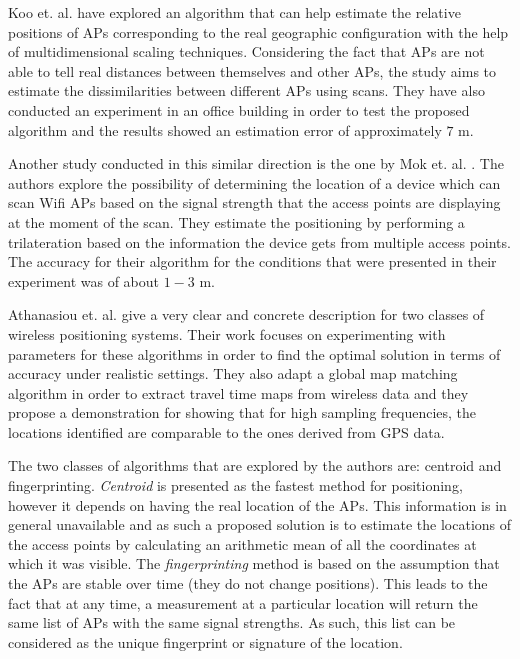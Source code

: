 Koo et. al. \cite{koo2011autonomous} have explored an algorithm that can help
estimate the relative positions of APs corresponding to the real geographic
configuration with the help of multidimensional scaling techniques. Considering
the fact that APs are not able to tell real distances between themselves and
other APs, the study aims to estimate the dissimilarities between different APs
using scans. They have also conducted an experiment in an office building in
order to test the proposed algorithm and the results showed an estimation error
of approximately $7$ m.

Another study conducted in this similar direction is the one by Mok et. al.
\cite{mok2007location}. The authors explore the possibility of determining the
location of a device which can scan Wifi APs based on the signal strength that
the access points are displaying at the moment of the scan. They estimate the
positioning by performing a trilateration based on the information the device
gets from multiple access points. The accuracy for their algorithm for the
conditions that were presented in their experiment was of about $1-3$ m.

Athanasiou et. al. \cite{athanasiou2009utilizing} give a very clear and
concrete description for two classes of wireless positioning systems. Their work
focuses on experimenting with parameters for these algorithms in order to find
the optimal solution in terms of accuracy under realistic settings. They also
adapt a global map matching algorithm in order to extract travel time maps from
wireless data and they propose a demonstration for showing that for high
sampling frequencies, the locations identified are comparable to the ones
derived from GPS data.

The two classes of algorithms that are explored by the authors are: centroid and
fingerprinting. \textit{Centroid} is presented as the fastest method for
positioning, however it depends on having the real location of the APs. This
information is in general unavailable and as such a proposed solution is to
estimate the locations of the access points by calculating an arithmetic mean of
all the coordinates at which it was visible. The \textit{fingerprinting} method
is based on the assumption that the APs are stable over time (they do not change
positions). This leads to the fact that at any time, a measurement at a
particular location will return the same list of APs with the same signal
strengths. As such, this list can be considered as the unique fingerprint or
signature of the location.

